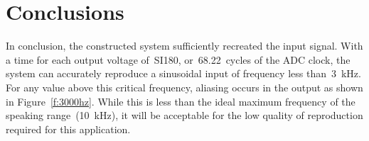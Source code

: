 \section{Conclusions}

In conclusion, the constructed system sufficiently recreated the input signal.
With a time for each output voltage of~SI{180}{\micro\second},
or~\SI{68.22}{cycles} of the ADC clock, the system can accurately reproduce a
sinusoidal input of frequency less than~\SI{3}{\kilo\hertz}.  For any value
above this critical frequency, aliasing occurs in the output as shown in
Figure~\ref{f:3000hz}.  While this is less than the ideal maximum frequency of
the speaking range~(\SI{10}{\kilo\hertz}), it will be acceptable for the low
quality of reproduction required for this application.
